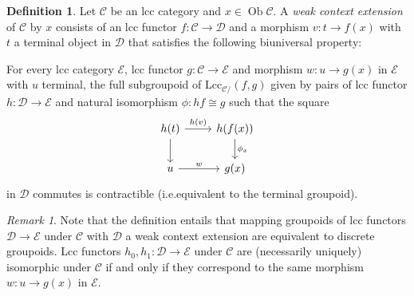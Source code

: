 \documentclass[a4paper]{article}
\theoremstyle{remark}
\newtheorem{remark}[theorem]{Remark}
\theoremstyle{definition}
\newtheorem{definition}[theorem]{Definition}
\begin{document}
\begin{definition}
  \label{def:weak-ext}
  Let $\mathcal{C}$ be an lcc category and $x \in \operatorname{Ob} \mathcal{C}$.
  A \emph{weak context extension} of $\mathcal{C}$ by $x$ consists of an lcc functor $f : \mathcal{C} \rightarrow \mathcal{D}$ and a morphism $v : t \rightarrow f(x)$ with $t$ a terminal object in $\mathcal{D}$ that satisfies the following biuniversal property:

  For every lcc category $\mathcal{E}$, lcc functor $g : \mathcal{C} \rightarrow \mathcal{E}$ and morphism $w : u \rightarrow g(x)$ in $\mathcal{E}$ with $u$ terminal, the full subgroupoid of $\mathrm{Lcc}_{\mathcal{C} /}(f, g)$ given by pairs of lcc functor $h : \mathcal{D} \rightarrow \mathcal{E}$ and natural isomorphism $\phi : hf \cong g$ such that the square
  \begin{equation}
    \begin{tikzcd}
      h(t) \arrow[d] \arrow[r, "h(v)"] & h(f(x)) \arrow[d, "\phi_x"] \\
      u \arrow[r, "w"] & g(x)
    \end{tikzcd}
  \end{equation}
  in $\mathcal{D}$ commutes is contractible (i.e.\@ equivalent to the terminal groupoid).
\end{definition}

\begin{remark}
  \label{rem:discrete-weak-ext-mapping}
  Note that the definition entails that mapping groupoids of lcc functors $\mathcal{D} \rightarrow \mathcal{E}$ under $\mathcal{C}$ with $\mathcal{D}$ a weak context extension are equivalent to discrete groupoids.
  Lcc functors $h_0, h_1 : \mathcal{D} \rightarrow \mathcal{E}$ under $\mathcal{C}$ are (necessarily uniquely) isomorphic under $\mathcal{C}$ if and only if they correspond to the same morphism $w : u \rightarrow g(x)$ in $\mathcal{E}$.
\end{remark}
\end{document}
